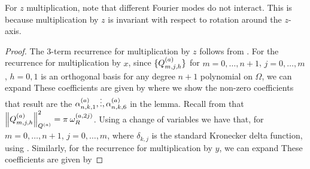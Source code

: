 \begin{remark}
	For $z$ multiplication, note that different Fourier modes do not interact. This is because multiplication by $z$ is invariant with respect to rotation around the $z$-axis. 
\end{remark}
\begin{proof}
	The 3-term recurrence for multiplication by $z$ follows from . For the recurrence for multiplication by $x$, since $\{Q_{m,j,h}^{(a)}\}$ for $m = 0,\dots,n+1$, $j = 0,\dots,m$, $h = 0,1$ is an orthogonal basis for any degree $n+1$ polynomial on $\Omega$, we can expand 
These coefficients are given by
where we show the non-zero coefficients that result are the $\alpha^{(a)}_{n,k,1},\vdots,\alpha^{(a)}_{n,k,6}$ in the lemma.
Recall from  that $\left\| Q_{m,j,h}^{(a)} \right\|_{Q^{(a)}}^2 = \pi \: \omega_R^{(a,2j)}$. Using a change of variables 
we have that, for $m = 0,\dots,n+1$, $j = 0,\dots,m$, 
where $\delta_{k, j}$ is the standard Kronecker delta function, using . Similarly, for the recurrence for multiplication by $y$, we can expand 
These coefficients are given by
\end{proof}
